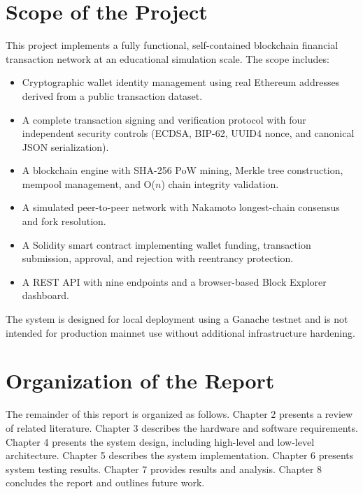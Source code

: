 \documentclass[12pt,a4paper]{report}
\begin{document}
\section{Scope of the Project}

This project implements a fully functional, self-contained blockchain financial transaction
network at an educational simulation scale. The scope includes:

\begin{itemize}
  \item Cryptographic wallet identity management using real Ethereum addresses derived from
        a public transaction dataset.
  \item A complete transaction signing and verification protocol with four independent
        security controls (ECDSA, BIP-62, UUID4 nonce, and canonical JSON serialization).
  \item A blockchain engine with SHA-256 PoW mining, Merkle tree construction, mempool
        management, and O($n$) chain integrity validation.
  \item A simulated peer-to-peer network with Nakamoto longest-chain consensus and
        fork resolution.
  \item A Solidity smart contract implementing wallet funding, transaction submission,
        approval, and rejection with reentrancy protection.
  \item A REST API with nine endpoints and a browser-based Block Explorer dashboard.
\end{itemize}

The system is designed for local deployment using a Ganache testnet and is not intended
for production mainnet use without additional infrastructure hardening.

\section{Organization of the Report}

The remainder of this report is organized as follows. Chapter 2 presents a review of
related literature. Chapter 3 describes the hardware and software requirements. Chapter 4
presents the system design, including high-level and low-level architecture. Chapter 5
describes the system implementation. Chapter 6 presents system testing results. Chapter 7
provides results and analysis. Chapter 8 concludes the report and outlines future work.

\end{document}
